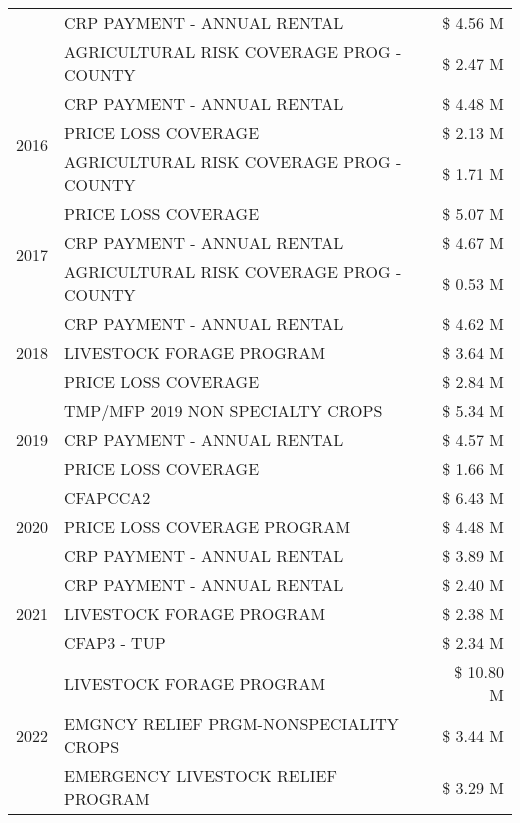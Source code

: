 \begin{tabular}{llr}
 & CRP PAYMENT - ANNUAL RENTAL & \$ 4.56 M \\
 & AGRICULTURAL RISK COVERAGE PROG - COUNTY & \$ 2.47 M \\
\cline{1-3}
\multirow[t]{3}{*}{2016} & CRP PAYMENT - ANNUAL RENTAL & \$ 4.48 M \\
 & PRICE LOSS COVERAGE & \$ 2.13 M \\
 & AGRICULTURAL RISK COVERAGE PROG - COUNTY & \$ 1.71 M \\
\cline{1-3}
\multirow[t]{3}{*}{2017} & PRICE LOSS COVERAGE & \$ 5.07 M \\
 & CRP PAYMENT - ANNUAL RENTAL & \$ 4.67 M \\
 & AGRICULTURAL RISK COVERAGE PROG - COUNTY & \$ 0.53 M \\
\cline{1-3}
\multirow[t]{3}{*}{2018} & CRP PAYMENT - ANNUAL RENTAL & \$ 4.62 M \\
 & LIVESTOCK FORAGE PROGRAM & \$ 3.64 M \\
 & PRICE LOSS COVERAGE & \$ 2.84 M \\
\cline{1-3}
\multirow[t]{3}{*}{2019} & TMP/MFP 2019 NON SPECIALTY CROPS & \$ 5.34 M \\
 & CRP PAYMENT - ANNUAL RENTAL & \$ 4.57 M \\
 & PRICE LOSS COVERAGE & \$ 1.66 M \\
\cline{1-3}
\multirow[t]{3}{*}{2020} & CFAPCCA2 & \$ 6.43 M \\
 & PRICE LOSS COVERAGE PROGRAM & \$ 4.48 M \\
 & CRP PAYMENT - ANNUAL RENTAL & \$ 3.89 M \\
\cline{1-3}
\multirow[t]{3}{*}{2021} & CRP PAYMENT - ANNUAL RENTAL & \$ 2.40 M \\
 & LIVESTOCK FORAGE PROGRAM & \$ 2.38 M \\
 & CFAP3 - TUP & \$ 2.34 M \\
\cline{1-3}
\multirow[t]{3}{*}{2022} & LIVESTOCK FORAGE PROGRAM & \$ 10.80 M \\
 & EMGNCY RELIEF PRGM-NONSPECIALITY CROPS & \$ 3.44 M \\
 & EMERGENCY LIVESTOCK RELIEF PROGRAM & \$ 3.29 M \\
\cline{1-3}
\bottomrule
\end{tabular}
